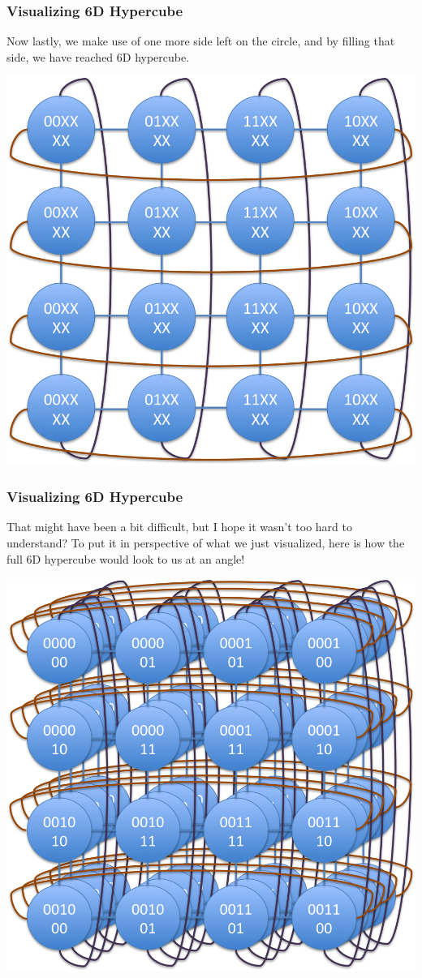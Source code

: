\documentclass[9pt]{beamer}
\begin{document}
\begin{frame}[fragile]
  \frametitle{Visualizing 6D Hypercube}
Now lastly, we make use of one more side left on the circle, and by filling that side, we have reached 6D hypercube.\\
\begin{center}
  \includegraphics[scale=.25]{6d_hypercube}
\end{center}
\end{frame}
\begin{frame}[fragile]
  \frametitle{Visualizing 6D Hypercube}
That might have been a bit difficult, but I hope it wasn't too hard to understand? To put it in perspective of what we just visualized, here is how the full 6D hypercube would look to us at an angle!
\begin{center}
  \includegraphics[scale=.25]{6d_hypercube_full}
\end{center}
\end{frame}
\end{document}

